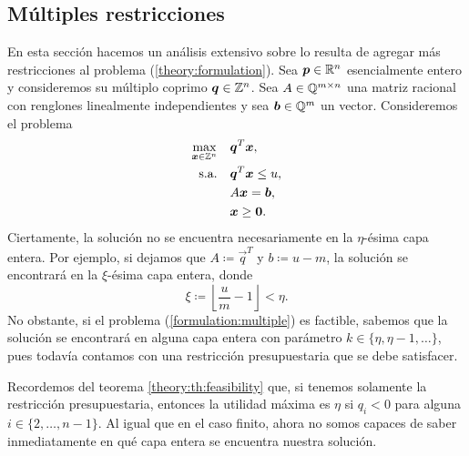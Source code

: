 \subsection{Múltiples restricciones}
\label{sec:multiple}
\noindent
En esta sección hacemos un análisis extensivo sobre lo resulta de agregar más restricciones al
problema (\ref{theory:formulation}). Sea $\boldsymbol{p} \in \mathbb{R}^n$ esencialmente entero y consideremos su
múltiplo coprimo $\boldsymbol{q} \in \mathbb{Z}^n$. Sea $A \in \mathbb{Q}^{m \times n}$ una matriz racional con renglones
linealmente independientes y sea $\boldsymbol{b} \in \mathbb{Q}^m$ un vector. Consideremos el problema
\begin{subequations}
	\label{formulation:multiple}
	\begin{align}
		\max_{\boldsymbol{x} \in \mathbb{Z}^n} \quad
			& \boldsymbol{q}^T\boldsymbol{x}, \label{formulation:multiple:objective} \\
		\text{s.a.} \quad
			& \boldsymbol{q}^T\boldsymbol{x} \leq u, \label{formulation:multiple:constraint:budget} \\
			& A\boldsymbol{x} = \boldsymbol{b}, \label{formulation:multiple:constraints} \\
			& \boldsymbol{x} \geq \boldsymbol{0}. \nonumber
	\end{align}
\end{subequations}
Ciertamente, la solución no se encuentra necesariamente en la $\eta$-ésima capa entera. Por ejemplo,
si dejamos que $A \coloneq \vec{q}^T$ y $b \coloneq u - m$, la solución se encontrará en la
$\xi$-ésima capa entera, donde
\begin{equation*}
	\xi \coloneq \left\lfloor \frac{u}{m} - 1 \right\rfloor < \eta.
\end{equation*}
No obstante, si el problema (\ref{formulation:multiple}) es factible, sabemos que la solución se
encontrará en alguna capa entera con parámetro $k \in \lbrace \eta, \eta - 1, \ldots \rbrace$, pues
todavía contamos con una restricción presupuestaria que se debe satisfacer.
\begin{observation}
	Recordemos del teorema \ref{theory:th:feasibility} que, si tenemos solamente la restricción
	presupuestaria, entonces la utilidad máxima es $\eta$ si $q_i < 0$ para alguna $i \in
	\lbrace 2, \ldots, n - 1\rbrace$. Al igual que en el caso finito, ahora no somos capaces de
	saber inmediatamente en qué capa entera se encuentra nuestra solución.
\end{observation}

